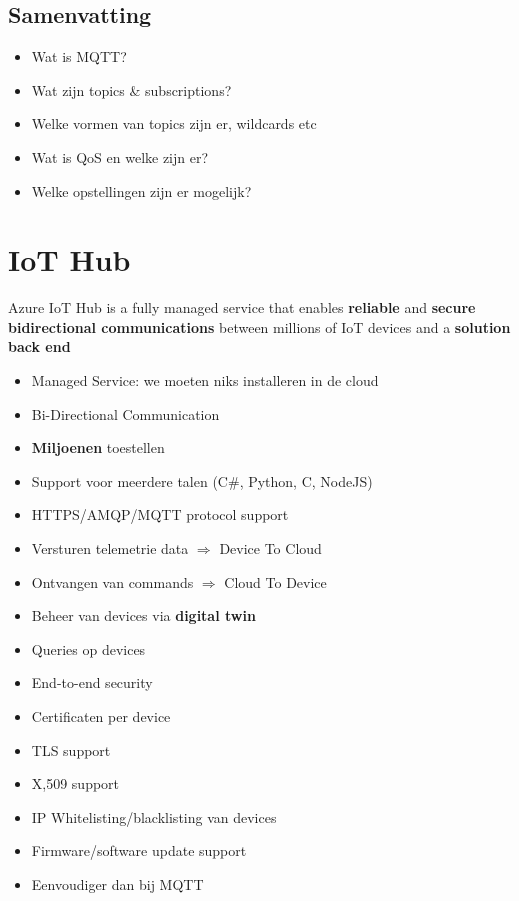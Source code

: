 \documentclass{article}
\newcommand{\bold}[1]{\textbf{#1}}
\begin{document}
\subsection{Samenvatting}

\begin{itemize}
    \item Wat is MQTT?
    \item Wat zijn topics \& subscriptions?
    \item Welke vormen van topics zijn er, wildcards etc
    \item Wat is QoS en welke zijn er?
    \item Welke opstellingen zijn er mogelijk?
\end{itemize}

\section{IoT Hub}

Azure IoT Hub is a fully managed service that enables \bold{reliable} and \bold{secure}
\bold{bidirectional communications} between millions of IoT devices and a
\bold{solution back end}

\begin{itemize}
    \item Managed Service: we moeten niks installeren in de cloud
    \item Bi-Directional Communication
    \item \bold{Miljoenen} toestellen
    \item Support voor meerdere talen (C\#, Python, C, NodeJS)
    \item HTTPS/AMQP/MQTT protocol support
    \item Versturen telemetrie data $\Rightarrow$ Device To Cloud
    \item Ontvangen van commands $\Rightarrow$ Cloud To Device
    \item Beheer van devices via \bold{digital twin}
    \item Queries op devices
    \item End-to-end security
    \item Certificaten per device
    \item TLS support
    \item X,509 support
    \item IP Whitelisting/blacklisting van devices
    \item Firmware/software update support
    \item Eenvoudiger dan bij MQTT
\end{itemize}
\end{document}

